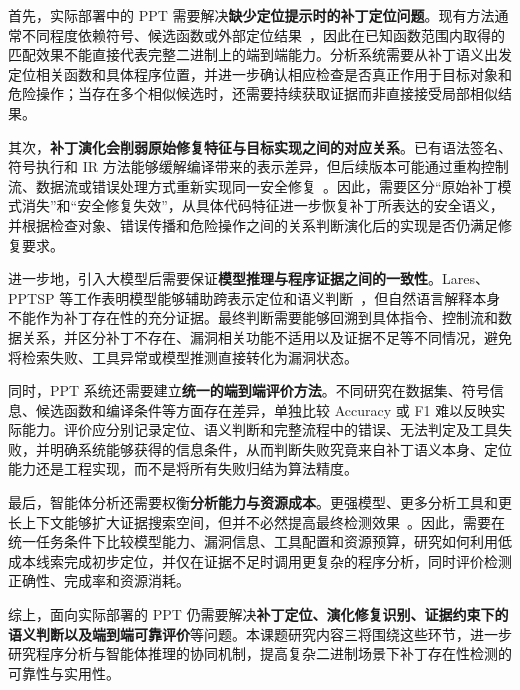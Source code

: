 首先，实际部署中的 PPT 需要解决\textbf{缺少定位提示时的补丁定位问题}。现有方法通常不同程度依赖符号、候选函数或外部定位结果~\cite{fiber,binxray,lares}，因此在已知函数范围内取得的匹配效果不能直接代表完整二进制上的端到端能力。分析系统需要从补丁语义出发定位相关函数和具体程序位置，并进一步确认相应检查是否真正作用于目标对象和危险操作；当存在多个相似候选时，还需要持续获取证据而非直接接受局部相似结果。

其次，\textbf{补丁演化会削弱原始修复特征与目标实现之间的对应关系}。已有语法签名、符号执行和 IR 方法能够缓解编译带来的表示差异，但后续版本可能通过重构控制流、数据流或错误处理方式重新实现同一安全修复~\cite{react,patchevolution}。因此，需要区分“原始补丁模式消失”和“安全修复失效”，从具体代码特征进一步恢复补丁所表达的安全语义，并根据检查对象、错误传播和危险操作之间的关系判断演化后的实现是否仍满足修复要求。

进一步地，引入大模型后需要保证\textbf{模型推理与程序证据之间的一致性}。Lares、PPTSP 等工作表明模型能够辅助跨表示定位和语义判断~\cite{lares,pptsp}，但自然语言解释本身不能作为补丁存在性的充分证据。最终判断需要能够回溯到具体指令、控制流和数据关系，并区分补丁不存在、漏洞相关功能不适用以及证据不足等不同情况，避免将检索失败、工具异常或模型推测直接转化为漏洞状态。

同时，PPT 系统还需要建立\textbf{统一的端到端评价方法}。不同研究在数据集、符号信息、候选函数和编译条件等方面存在差异，单独比较 Accuracy 或 F1 难以反映实际能力。评价应分别记录定位、语义判断和完整流程中的错误、无法判定及工具失败，并明确系统能够获得的信息条件，从而判断失败究竟来自补丁语义本身、定位能力还是工程实现，而不是将所有失败归结为算法精度。

最后，智能体分析还需要权衡\textbf{分析能力与资源成本}。更强模型、更多分析工具和更长上下文能够扩大证据搜索空间，但并不必然提高最终检测效果~\cite{sweagent,aiagentsthatmatter}。因此，需要在统一任务条件下比较模型能力、漏洞信息、工具配置和资源预算，研究如何利用低成本线索完成初步定位，并仅在证据不足时调用更复杂的程序分析，同时评价检测正确性、完成率和资源消耗。

综上，面向实际部署的 PPT 仍需要解决\textbf{补丁定位、演化修复识别、证据约束下的语义判断以及端到端可靠评价}等问题。本课题研究内容三将围绕这些环节，进一步研究程序分析与智能体推理的协同机制，提高复杂二进制场景下补丁存在性检测的可靠性与实用性。
